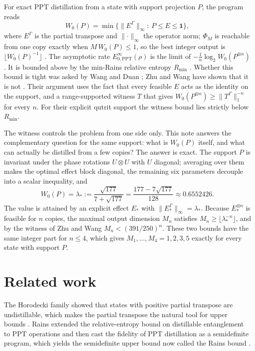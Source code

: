 \documentclass[11pt,a4paper]{article}
\theoremstyle{definition}
\theoremstyle{plain}
\newcommand{\norm}[1]{\lVert#1\rVert}
\newcommand{\one}{\mathbf{1}}
\begin{document}
For exact PPT distillation from a state with support projection $P$, the
program reads
\begin{equation}\label{eq:W0}
W_0(P)=\min\bigl\{\norm{E^\Gamma}_\infty:\ P\le E\le\one\bigr\},
\end{equation}
where $E^\Gamma$ is the partial transpose and $\norm{\cdot}_\infty$ the
operator norm; $\Phi_M$ is reachable from one copy exactly when
$M\,W_0(P)\le1$, so the best integer output is
$\lfloor W_0(P)^{-1}\rfloor$ \cite{WangDuan2016,ZhuWang2026}. The asymptotic
rate $E^\infty_{0,\mathrm{PPT}}(\rho)$ is the limit of
$-\frac1n\log_2W_0(P^{\otimes n})$. It is bounded above by the min-Rains
relative entropy $R_{\min}$ \cite{WangDuan2017}. Whether this bound is
tight was asked by Wang and Duan \cite{WangDuan2017}; Zhu and Wang have
shown that it is not \cite{ZhuWang2026}. Their argument uses the fact
that every feasible $E$ acts as the identity on the support, and a
range-supported witness $T$ that gives $W_0(P^{\otimes n})\ge
\norm{T^\Gamma}_1^{-n}$ for every $n$. For their explicit qutrit support the
witness bound lies strictly below $R_{\min}$.

The witness controls the problem from one side only. This note answers the
complementary question for the same support: what is $W_0(P)$ itself, and
what can actually be distilled from a few copies? The answer is exact. The
support $P$ is invariant under the phase rotations $U\otimes U$ with $U$
diagonal; averaging over them makes the optimal effect block diagonal, the
remaining six parameters decouple into a scalar inequality, and
\[
W_0(P)=\lambda_*:=\frac{\sqrt{177}}{7+\sqrt{177}}=\frac{177-7\sqrt{177}}{128}
\approx0.6552426.
\]
The value is attained by an explicit effect $E_*$ with
$\norm{E_*^\Gamma}_\infty=\lambda_*$. Because $E_*^{\otimes n}$ is feasible for
$n$ copies, the maximal output dimension $M_n$ satisfies
$M_n\ge\lfloor\lambda_*^{-n}\rfloor$, and by the witness of Zhu and Wang
$M_n<(391/250)^n$. These two bounds have the same integer part for
$n\le4$, which gives $M_1,\dots,M_4=1,2,3,5$ exactly for every state with
support $P$.

\section{Related work}\label{sec:related}
The Horodecki family showed that states with positive
partial transpose are undistillable, which makes the partial transpose the
natural tool for upper bounds \cite{Horodecki1998}. Rains extended the
relative-entropy bound on distillable entanglement to PPT operations
\cite{Rains1999} and then cast the fidelity of PPT distillation as a
semidefinite program, which yields the semidefinite upper bound now called the
Rains bound \cite{Rains2001}.
\end{document}
